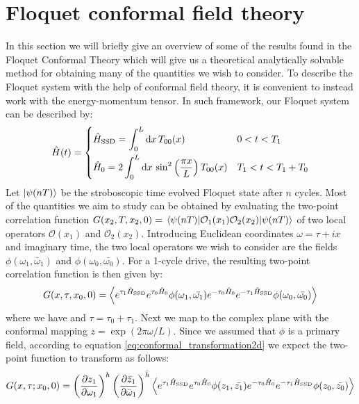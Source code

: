 \documentclass[11pt, a4paper, oneside]{book}
\theoremstyle{definition} %
\begin{document}
\section{Floquet conformal field theory}
\label{sec:Floquet_Conformal_Field_Theory}
In this section we will briefly give an overview of some of the results found in the Floquet Conformal Theory \cite{Xueda}\cite{Lapierre}\cite{Andersen} which will give us a theoretical analytically solvable method for obtaining many of the quantities we wish to consider. To describe the Floquet system with the help of conformal field theory, it is convenient to instead work with the energy-momentum tensor. In such framework, our Floquet system can be described by:
	\begin{equation}
	\hat{H}(t) = 
		\begin{dcases}
		\hat{H}_\text{SSD} = \int_0^L \dd x \, T_{00}(x)\quad &0<t< T_1 \\
		\hat{H}_0 = 2\int_0^L \dd x \, \sin^2\left(\frac{\pi x}{L} \right) T_{00}(x) &T_1 < t < T_1 + T_0
		\end{dcases}
	\end{equation}
 Let $\ket{\psi(nT)}$ be the stroboscopic time evolved Floquet state after $n$ cycles. Most of the quantities we aim to study can be obtained by evaluating the two-point correlation function $G(x_2,T,x_2,0)= \mel{\psi(nT)}{\mathcal{O}_1(x_1) \mathcal{O}_2(x_2)}{\psi(nT)}$ of two local operators $\mathcal{O}(x_1)$ and $\mathcal{O}_2(x_2)$. Introducing Euclidean coordinates $\omega = \tau + ix$ and imaginary time, the two local operators we wish to consider are the fields $\phi(\omega_1, \bar{\omega}_1)$ and $\phi(\omega_0, \bar{\omega_0})$. For a 1-cycle drive, the resulting two-point correlation function is then given by:
 \begin{equation}
 	G(x, \tau,x_0, 0) = \expval{e^{\tau_1 \hat{H}_\text{SSD}} e^{\tau_0 \hat{H}_0} \phi(\omega_1, \bar{\omega_1}) e^{-\tau_0 \hat{H}_0} e^{-\tau_1 \hat{H}_\text{SSD}}\phi(\omega_0, \bar{\omega_0})}
 \end{equation}
where we have and $\tau = \tau_0 + \tau_1$. Next we map to the complex plane with the conformal mapping $z = \exp(2\pi \omega/L)$. Since we assumed that $\phi$ is a primary field, according to equation \ref{eq:conformal_transformation2d} we expect the two-point function to transform as follows:
\begin{equation}
	G(x, \tau;x_0, 0) = \left(\pdv{z_1}{\omega_1}\right)^h \left(\pdv{\bar{z}_1}{\bar{\omega}_1} \right)^{\bar{h}}\expval{e^{\tau_1 \hat{H}_\text{SSD}} e^{\tau_0 \hat{H}_0} \phi(z_1, \bar{z_1}) e^{-\tau_0 \hat{H}_0} e^{-\tau_1 \hat{H}_\text{SSD}}\phi(z_0, \bar{z_0})}
\end{equation}
\end{document}
